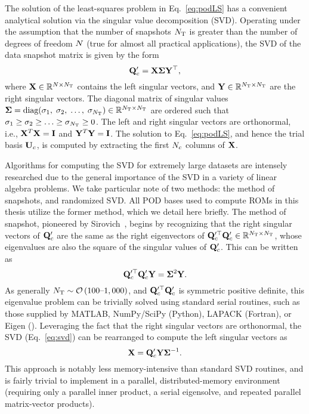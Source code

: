 The solution of the least-squares problem in Eq.~\ref{eq:podLS} has a convenient analytical solution via the singular value decomposition (SVD). Operating under the assumption that the number of snapshots $N_{\text{T}}$ is greater than the number of degrees of freedom $N$ (true for almost all practical applications), the SVD of the data snapshot matrix is given by the form
\begin{equation}\label{eq:svd}
    \consDataMatUns = \leftEvecMat \singVecMat \rightEvecMat^\top,
\end{equation}
where $\leftEvecMat \inRTwo{\numDOF}{\numSnaps}$ contains the left singular vectors, and $\rightEvecMat \inRTwo{\numSnaps}{\numSnaps}$ are the right singular vectors. The diagonal matrix of singular values $\boldsymbol{\Sigma} = \text{diag}(\sigma_1, \; \sigma_2, \; \hdots, \; \sigma_{N_{\text{T}}}) \in \mathbb{R}^{N_{\text{T}} \times N_{\text{T}}}$ are ordered such that $\sigma_1 \geq \sigma_2 \geq \hdots \geq \sigma_{N_{\text{T}}} \geq 0 $. The left and right singular vectors are orthonormal, i.e., $\leftEvecMat^T \leftEvecMat = \identMat$ and $\rightEvecMat^T \rightEvecMat = \identMat$. The solution to Eq.~\ref{eq:podLS}, and hence the trial basis $\consTrial$, is computed by extracting the first $N_c$ columns of $\leftEvecMat$.

Algorithms for computing the SVD for extremely large datasets are intensely researched due to the general importance of the SVD in a variety of linear algebra problems. We take particular note of two methods: the method of snapshots, and randomized SVD. All POD bases used to compute ROMs in this thesis utilize the former method, which we detail here briefly. The method of snapshot, pioneered by Sirovich~\cite{Sirovich1987}, begins by recognizing that the right singular vectors of $\consDataMatUns$ are the same as the right eigenvectors of $\consDataMatUns^\top \consDataMatUns \inRTwo{\numSnaps}{\numSnaps}$, whose eigenvalues are also the square of the singular values of $\consDataMatUns$. This can be written as
%
\begin{equation}
	\consDataMatUns^\top \consDataMatUns \rightEvecMat = \singVecMat^2 \rightEvecMat.
\end{equation}
%
As generally $N_{\text{T}}\sim\mathcal{O}\left(100\text{--}1,000\right)$, and $\consDataMatUns^\top \consDataMatUns$ is symmetric positive definite, this eigenvalue problem can be trivially solved using standard serial routines, such as those supplied by MATLAB, NumPy/SciPy (Python), LAPACK (Fortran), or Eigen (\CC). Leveraging the fact that the right singular vectors are orthonormal, the SVD (Eq.~\ref{eq:svd}) can be rearranged to compute the left singular vectors as
%
\begin{equation}
	\leftEvecMat = \consDataMatUns \rightEvecMat \singVecMat^{-1}.
\end{equation}
%
This approach is notably less memory-intensive than standard SVD routines, and is fairly trivial to implement in a parallel, distributed-memory environment (requiring only a parallel inner product, a serial eigensolve, and repeated parallel matrix-vector products).

